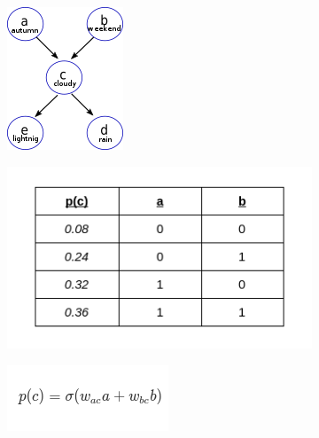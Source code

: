 \begin{figure}
	\centering
	\begin{subfigure}[t]{.33\textwidth}
  		\centering
  		\includegraphics[width=.6\linewidth]{imgs/bayesnet1.png}
  		\caption{}
  		\label{fig:sub1}
	\end{subfigure}%
	\begin{subfigure}[t]{.33\textwidth}
  		\centering
  		\includegraphics[width=.9\linewidth]{imgs/bayesnet2.png}
  		\caption{}
  		\label{fig:sub2}
	\end{subfigure}
	\begin{subfigure}[t]{.33\textwidth}
  		\centering
  		\includegraphics[width=.7\linewidth]{imgs/bayesnet3.png}

\end{subfigure}
\end{figure}
